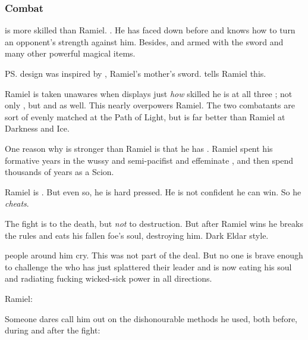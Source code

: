 \begin{garbage}
\subsubsection{Combat}
\Dasteron{} is more skilled than Ramiel. 
. 
He has faced down \satharioth{} before and knows how to turn an opponent's strength against him. 
Besides,  and armed with the sword \hs{\Scaleron} and many other powerful magical items. 

\ps{\Scaleron} design was inspired by \hs{\Ascaril}, Ramiel's mother's sword. 
\Dasteron{} tells Ramiel this. 

Ramiel is taken unawares when \Dasteron{} displays just \emph{how} skilled he is at all three ; not only , but  and  as well. 
This nearly overpowers Ramiel. 
The two combatants are sort of evenly matched at the Path of Light, but \Dasteron{} is far better than Ramiel at Darkness and Ice. 

One reason why \Dasteron{} is stronger than Ramiel is that he has .  
Ramiel spent his formative years in the wussy and semi-pacifist and effeminate \Merkyrah{}, and then spend thousands of years  as a Scion.  

Ramiel is . 
But even so, he is hard pressed. 
He is not confident he can win. 
So he \emph{cheats}. 

The fight is to the death, but \emph{not} to destruction. 
But after Ramiel wins he breaks the rules and eats his fallen foe's soul, destroying him. 
Dark Eldar style. 

 people around him cry. 
This was not part of the deal.
But no one is brave enough to challenge the \sathariah{} who has just splattered their leader and is now eating his soul and radiating fucking wicked-sick \sathariah{} power in all directions. 

Ramiel: 

Someone dares call him out on the dishonourable methods he used, both before, during and after the fight: 


\end{garbage}
